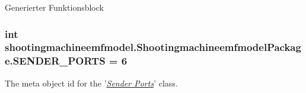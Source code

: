Generierter Funktionsblock  \hypertarget{interfaceshootingmachineemfmodel_1_1_shootingmachineemfmodel_package_a7daade5e29330373c428f1ec50fd984b}{
\subsubsection[{S\-E\-N\-D\-E\-R\-\_\-\-P\-O\-R\-T\-S}]{\setlength{\rightskip}{0pt plus 5cm}int shootingmachineemfmodel.\-Shootingmachineemfmodel\-Package.\-S\-E\-N\-D\-E\-R\-\_\-\-P\-O\-R\-T\-S = 6}}\label{interfaceshootingmachineemfmodel_1_1_shootingmachineemfmodel_package_a7daade5e29330373c428f1ec50fd984b}
The meta object id for the '\hyperlink{classshootingmachineemfmodel_1_1impl_1_1_sender_ports_impl}{{\itshape Sender Ports}}' class.

